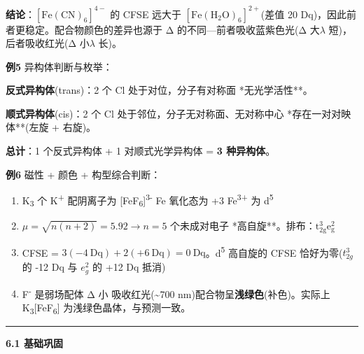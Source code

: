 \textbf{结论}：\([\mathrm{Fe(CN)_6}]^{4-}\) 的 CFSE 远大于 \([\mathrm{Fe(H_2O)_6}]^{2+}\)(差值 20 Dq)，因此前者更稳定。配合物颜色的差异也源于 Δ 的不同---前者吸收蓝紫色光(Δ 大\箭\(\lambda\) 短)，后者吸收红光(Δ 小\箭\(\lambda\) 长)。

\textbf{例5} 异构体判断与枚举：

\textbf{反式异构体}(trans)：2 个 Cl 处于对位，分子有对称面 \箭 **无光学活性**。

\textbf{顺式异构体}(cis)：2 个 Cl 处于邻位，分子无对称面、无对称中心 \箭 **存在一对对映体**(左旋 + 右旋)。

\textbf{总计}：1 个反式异构体 + 1 对顺式光学异构体 = \textbf{3 种异构体}。

\textbf{例6} 磁性 + 颜色 + 构型综合判断：

\begin{enumerate}
\def\labelenumi{(\arabic{enumi})}
\item
  K\textsubscript{3}  个 K\textsuperscript{+} \箭 配阴离子为 {[}FeF\textsubscript{6}{]}\textsuperscript{3-} \箭 Fe 氧化态为 +3 \箭 Fe\textsuperscript{3+} 为 d\textsuperscript{5}
\item
  \(\mu = \sqrt{n(n+2)} = 5.92 \rightarrow n = 5\)  个未成对电子 \箭 **高自旋**。排布：\(\mathrm{t_{2g}^3 e_g^2}\)
\item
  CFSE = \(3(-4\ \mathrm{Dq}) + 2(+6\ \mathrm{Dq}) = 0\ \mathrm{Dq}\)。d\textsuperscript{5} 高自旋的 CFSE 恰好为零(\(t_{2g}^3\) 的 -12 Dq 与 \(e_g^2\) 的 +12 Dq 抵消)
\item
  F\textsuperscript{-} 是弱场配体 \箭 Δ 小 \箭 吸收红光(\textasciitilde700 nm)\箭 配合物呈\textbf{浅绿色}(补色)。实际上 K\textsubscript{3}{[}FeF\textsubscript{6}{]} 为浅绿色晶体，与预测一致。
\end{enumerate}

\begin{center}\rule{0.5\linewidth}{0.5pt}\end{center}

\textbf{6.1 基础巩固}

